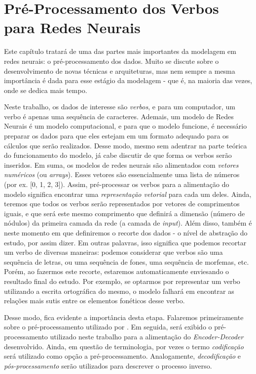 \chapter{Pré-Processamento dos Verbos para Redes Neurais}
\label{ch:02}

Este capítulo tratará de uma das partes mais importantes da modelagem em redes neurais: o pré-processamento dos dados. Muito se discute sobre o desenvolvimento de novas técnicas e arquiteturas, mas nem sempre a mesma importância é dada para esse estágio da modelagem - que é, na maioria das vezes, onde se dedica mais tempo. 

Neste trabalho, os dados de interesse são \textit{verbos}, e para um computador, um verbo é apenas uma sequência de caracteres. Ademais, um modelo de Redes Neurais é um modelo computacional, e para que o modelo funcione, é necessário preparar os dados para que eles estejam em um formato adequado para os cálculos que serão realizados. Desse modo, mesmo sem adentrar na parte teórica do funcionamento do modelo, já cabe discutir de que forma os verbos serão inseridos. Em suma, os modelos de redes neurais são alimentados com \textit{vetores numéricos} (ou \textit{arrays}). Esses vetores são essencialmente uma lista de números (por ex. [0, 1, 2, 3]). Assim, pré-processar os verbos para a alimentação do modelo significa encontrar uma \textit{representação vetorial} para cada um deles. Ainda, teremos que todos os verbos serão representados por vetores de comprimentos iguais, e que será este mesmo comprimento que definirá a dimensão (número de nódulos) da primeira camada da rede (a camada de \textit{input}). Além disso, também é neste momento em que definiremos o recorte dos dados - o nível de abstração do estudo, por assim dizer. Em outras palavras, isso significa que podemos recortar um verbo de diversas maneiras: podemos considerar que verbos são uma sequência de letras, ou uma sequência de fones, uma sequência de morfemas, etc. Porém, ao fazermos este recorte, estaremos automaticamente enviesando o resultado final do estudo. Por exemplo, se optarmos por representar um verbo utilizando a escrita ortográfica do mesmo, o modelo falhará em encontrar as relações mais sutis entre os elementos fonéticos desse verbo.

Desse modo, fica evidente a importância desta etapa. Falaremos primeiramente sobre o pré-processamento utilizado por \cite{rumelhart:1986}. Em seguida, será exibido o pré-processamento utilizado neste trabalho para a alimentação do \textit{Encoder-Decoder} desenvolvido. Ainda, em questão de terminologia, por vezes o termo \textit{codificação} será utilizado como opção a pré-processamento. Analogamente, \textit{decodificação} e \textit{pós-processamento} serão utilizados para descrever o processo inverso. 

